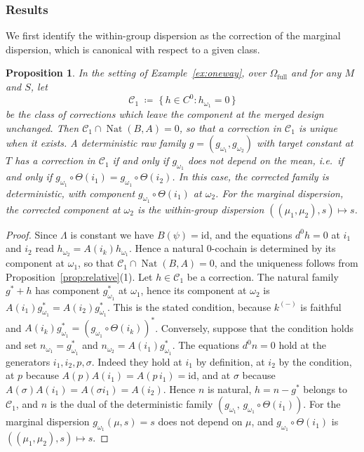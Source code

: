 \documentclass[11pt,a4paper]{article}
\theoremstyle{plain}
\newtheorem{proposition}[theorem]{Proposition}
\theoremstyle{definition}
\theoremstyle{remark}
\newcommand{\cat}[1]{\mathsf{#1}}
\newcommand{\catO}{\cat{\Omega}}
\newcommand{\id}{\mathrm{id}}
\DeclareMathOperator{\Nat}{Nat}
\begin{document}
\subsubsection*{Results}

We first identify the within-group dispersion as the correction of the
marginal dispersion, which is canonical with respect to a given class.

\begin{proposition}\label{prop:canonical}
In the setting of Example~\ref{ex:oneway}, over $\catO_{\mathrm{full}}$ and for
any $M$ and $S$, let
\[
\mathcal{C}_{1} \;\coloneqq\; \{\,h \in C^{0} : h_{\omega_1} = 0\,\}
\]
be the class of corrections which leave the component at the merged design
unchanged. Then $\mathcal{C}_{1} \cap \Nat(B,A) = 0$, so that a correction in
$\mathcal{C}_{1}$ is unique when it exists. A deterministic raw family
$g = (g_{\omega_1},g_{\omega_2})$ with target constant at $T$ has a correction
in $\mathcal{C}_{1}$ if and only if $g_{\omega_1}$ does not depend on the
mean, i.e.\ if and only if
$g_{\omega_1} \circ \Theta(i_1) = g_{\omega_1} \circ \Theta(i_2)$. In this case,
the corrected family is deterministic, with component
$g_{\omega_1} \circ \Theta(i_1)$ at $\omega_2$. For the marginal dispersion, the
corrected component at $\omega_2$ is the within-group dispersion
$((\mu_1,\mu_2),s) \mapsto s$.
\end{proposition}

\begin{proof}
Since $\Lambda$ is constant we have $B(\psi) = \id$, and the equations
$d^{0}h = 0$ at $i_1$ and $i_2$ read $h_{\omega_2} = A(i_k)h_{\omega_1}$.
Hence a natural $0$-cochain is determined by its component at $\omega_1$, so
that $\mathcal{C}_{1} \cap \Nat(B,A) = 0$, and the uniqueness follows from
Proposition~\ref{prop:relative}(1). Let $h \in \mathcal{C}_{1}$ be a
correction. The natural family $g^{*}+h$ has component $g^{*}_{\omega_1}$ at
$\omega_1$, hence its component at $\omega_2$ is
$A(i_1)g^{*}_{\omega_1} = A(i_2)g^{*}_{\omega_1}$. This is the stated
condition, because $k^{(-)}$ is faithful and
$A(i_k)g^{*}_{\omega_1} = (g_{\omega_1}\circ\Theta(i_k))^{*}$. Conversely,
suppose that the condition holds and set $n_{\omega_1} = g^{*}_{\omega_1}$ and
$n_{\omega_2} = A(i_1)g^{*}_{\omega_1}$. The equations $d^{0}n = 0$ hold at
the generators $i_1, i_2, p, \sigma$. Indeed they hold at $i_1$ by definition,
at $i_2$ by the condition, at $p$ because $A(p)A(i_1) = A(p\,i_1) = \id$, and
at $\sigma$ because $A(\sigma)A(i_1) = A(\sigma i_1) = A(i_2)$. Hence $n$ is
natural, $h = n - g^{*}$ belongs to $\mathcal{C}_{1}$, and $n$ is the dual of
the deterministic family $(g_{\omega_1},\, g_{\omega_1}\circ\Theta(i_1))$. For
the marginal dispersion $g_{\omega_1}(\mu,s) = s$ does not depend on $\mu$,
and $g_{\omega_1}\circ\Theta(i_1)$ is $((\mu_1,\mu_2),s) \mapsto s$.
\end{proof}
\end{document}
